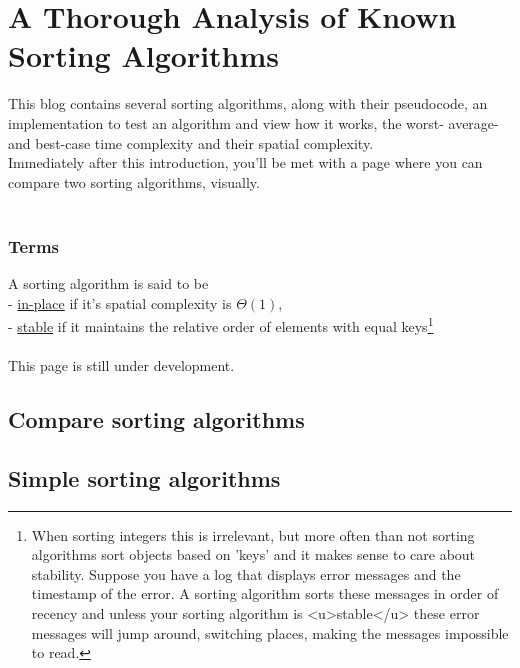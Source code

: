 
\section{A Thorough Analysis of Known Sorting Algorithms}
This blog contains several sorting algorithms, along with their pseudocode, an implementation to test an algorithm and
view how it works, the worst- average- and best-case time complexity and their spatial complexity.\\
Immediately after this introduction, you'll be met with a page where you can compare two sorting algorithms, visually.
\\\\
\subsubsection{Terms}
A sorting algorithm is said to be\\
- \underline{in-place} if it's spatial complexity is $\Theta(1)$,\\
- \underline{stable} if it maintains the relative order of elements with equal keys\footnote{
    When sorting integers this is irrelevant, but more often than not sorting algorithms sort objects based on
    'keys' and it makes sense to care about stability. Suppose you have a log that displays error messages and the
    timestamp of the error. A sorting algorithm sorts these messages in order of recency and 
    unless your sorting algorithm is <u>stable</u> these error messages will jump around, 
    switching places, making the messages impossible to read.
}
\\\\
This page is still under development.

\subsection{Compare sorting algorithms}

\subsection{Simple sorting algorithms}
